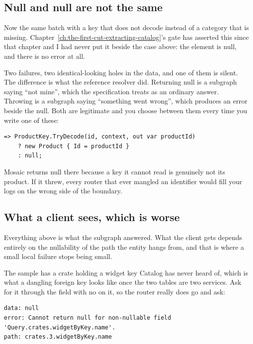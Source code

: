 \subsection*{Null and null are not the same}

%
Now the same batch with a key that does not decode instead of a category that
is missing. Chapter~\ref{ch:the-first-cut-extracting-catalog}'s gate has
asserted this since that chapter and I had never put it beside the case above:
the element is null, and there is no error at all.

Two failures, two identical-looking holes in the data, and one of them is
silent. The difference is what the reference resolver did. Returning null is a
subgraph saying \enquote{not mine}, which the specification treats as an
ordinary answer. Throwing is a subgraph saying \enquote{something went wrong},
which produces an error beside the null. Both are legitimate and you choose
between them every time you write one of these:

\begin{verbatim}
=> ProductKey.TryDecode(id, context, out var productId)
    ? new Product { Id = productId }
    : null;
\end{verbatim}

Mosaic returns null there because a key it cannot read is genuinely not its
product. If it threw, every router that ever mangled an identifier would fill
your logs on the wrong side of the boundary.

\subsection*{What a client sees, which is worse}

%
Everything above is what the subgraph answered. What the client gets depends
entirely on the nullability of the path the entity hangs from, and that is
where a small local failure stops being small.

The sample has a crate holding a widget key Catalog has never heard of, which
is what a dangling foreign key looks like once the two tables are two services.
Ask for it through the field with no  on it, so the router
really does go and ask:

\begin{verbatim}
data: null
error: Cannot return null for non-nullable field 'Query.crates.widgetByKey.name'.
path: crates.3.widgetByKey.name
\end{verbatim}

